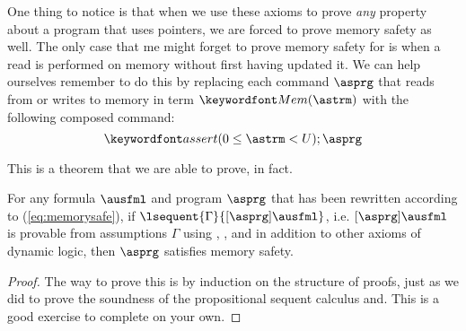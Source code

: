 \documentclass[11pt,twoside]{scrartcl}
\begin{document}
One thing to notice is that when we use these axioms to prove \emph{any} property about a program that uses pointers, we are forced to prove memory safety as well. The only case that me might forget to prove memory safety for is when a read is performed on memory without first having updated it. We can help ourselves remember to do this by replacing each command $\asprg$ that reads from or writes to memory in term $\pderef{\astrm}$ with the following composed command:
\begin{equation}
\label{eq:memorysafe}
\passert{0 \le \astrm < \maxmem};\asprg
\end{equation}

This is a theorem that we are able to prove, in fact.
\begin{theorem}
For any formula $\ausfml$ and program $\asprg$ that has been rewritten according to (\ref{eq:memorysafe}), if $\lsequent{\Gamma}{\dibox{\asprg}{\ausfml}}$, i.e. $\dibox{\asprg}{\ausfml}$ is provable from assumptions $\Gamma$ using , , and  in addition to other axioms of dynamic logic, then $\asprg$ satisfies memory safety.
\end{theorem}
\begin{proof}
The way to prove this is by induction on the structure of proofs, just as we did to prove the soundness of the propositional sequent calculus and. This is a good exercise to complete on your own.
\end{proof}
\end{document}
